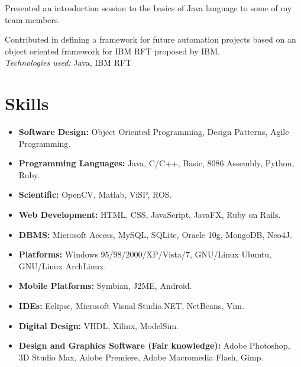 \documentclass{res}
\begin{document}
\begin{resume}
   Presented an introduction session to the basics of Java language to some of my team members.

   Contributed in defining a framework for future automation projects based on an object oriented framework for IBM RFT proposed by IBM.\\
    {\sl Technologies used:} Java, IBM RFT


\section{Skills}
    \begin{itemize}
      \item \textbf{Software Design:} Object Oriented Programming, Design Patterns, Agile Programming.
      \item \textbf{Programming Languages:} Java, C/C++, Basic, 8086 Assembly, Python, Ruby.
      \item \textbf{Scientific:} OpenCV, Matlab, ViSP, ROS.
      \item \textbf{Web Development:} HTML, CSS, JavaScript, JavaFX, Ruby on Rails.
      \item \textbf{DBMS:} Microsoft Access, MySQL, SQLite, Oracle 10g, MongoDB, Neo4J.
      \item \textbf{Platforms:} Windows 95/98/2000/XP/Vista/7, GNU/Linux Ubuntu, GNU/Linux ArchLinux.
      \item \textbf{Mobile Platforms:} Symbian, J2ME, Android.
      \item \textbf{IDEs:} Eclipse, Microsoft Visual Studio.NET, NetBeans, Vim.
      \item \textbf{Digital Design:} VHDL, Xilinx, ModelSim.
      \item \textbf{Design and Graphics Software (Fair knowledge):} Adobe Photoshop, 3D Studio Max, Adobe Premiere, Adobe Macromedia Flash, Gimp.
    \end{itemize}
 

\end{resume}
\end{document}
